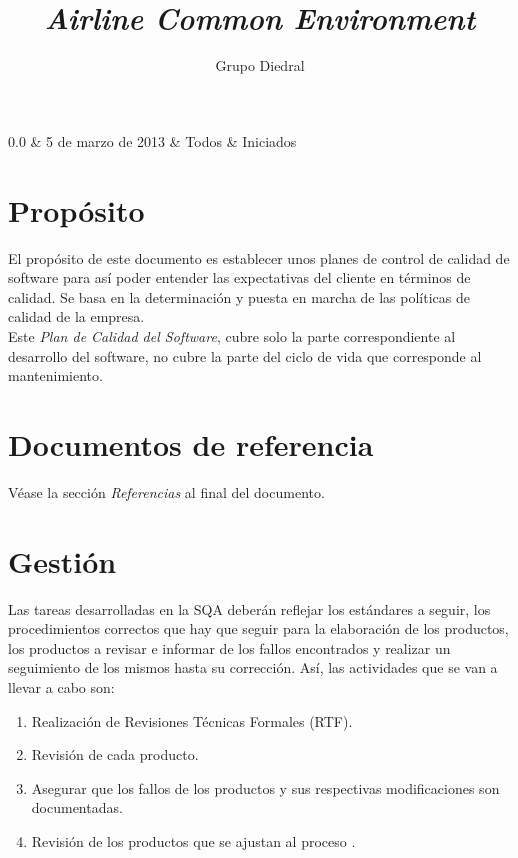 \documentclass[11pt, a4paper, twoside, titlepage]{article}
\title{\doctitle\\\textsl{Airline Common Environment}}
\author{Grupo Diedral}
\newcommand*{\doctitle}{Plan de calidad}
\newcommand*{\docversion}{2.0}
\begin{document}
	\begin{tablacambios}
		0.0 & 5 de marzo de 2013 & Todos & Iniciados
	\end{tablacambios}


	\portadaace{\doctitle}{\docversion}

	\tableofcontents
	\newpage

	\iniciarnumeraciondiedral
		
	\section{Propósito}	%
		El propósito de este documento es establecer unos planes de control de calidad de software para así poder entender las expectativas del cliente en términos de calidad. Se basa en la determinación y puesta en marcha de las políticas de calidad de la empresa. \\

		Este \textit{Plan de Calidad del Software}, cubre solo la parte correspondiente al desarrollo del software, no cubre la parte del ciclo de vida que corresponde al mantenimiento.
		
	\section{Documentos de referencia}
		\nocite{IEEE730-2002}
		\nocite{IEEE1028-1997}
		\nocite{IEEE1058-1998}
		\nocite{IEEE1012-1998}
		\nocite{PSMAN}

		Véase la sección {\itshape Referencias} al final del documento.

	\section{Gestión} %
		Las tareas desarrolladas en la SQA deberán reflejar los estándares a seguir, los procedimientos correctos que hay que seguir para la elaboración de los productos, los productos a revisar e informar de los fallos encontrados y realizar un seguimiento de los mismos hasta su corrección. Así, las actividades que se van a llevar a cabo son: \\

			\begin{enumerate}
				\item Realización de Revisiones Técnicas Formales (RTF).
				\item Revisión de cada producto. %
				\item Asegurar que los fallos de los productos y sus respectivas modificaciones son documentadas.
				\item Revisión de los productos que se ajustan al proceso \software.
			\end{enumerate}
\end{document}
